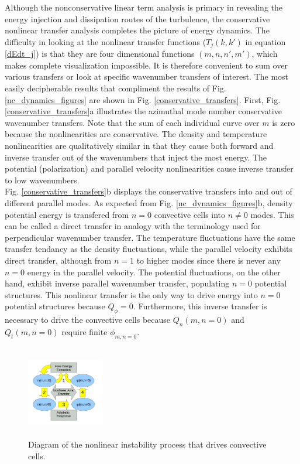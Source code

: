 \documentclass[12pt]{article}
\begin{document}
Although the nonconservative linear term analysis is primary in revealing the energy injection and dissipation routes of the turbulence, the conservative nonlinear transfer analysis completes
the picture of energy dynamics. The difficulty in looking at the nonlinear transfer functions ($T_{j}(k,k')$ in equation \ref{dEdt_j}) is that they are four dimensional functions $(m,n,n',m')$, 
which makes complete visualization impossible. It is therefore convenient to sum over various transfers or look at specific wavenumber transfers of interest. The most easily decipherable
results that compliment the results of Fig. \ref{nc_dynamics_figures} are shown in Fig. \ref{conservative_transfers}. First, Fig. \ref{conservative_transfers}a illustrates the azimuthal mode
number conservative wavenumber transfers. Note that the sum of each individual curve over $m$ is zero because the nonlinearities are conservative. The density and temperature nonlinearities
are qualitatively similar in that they cause both forward and inverse transfer out of the wavenumbers that inject the most energy. The potential (polarization) and parallel velocity 
nonlinearities cause inverse transfer to low wavenumbers. \\

Fig. \ref{conservative_transfers}b displays the conservative transfers into and out
of different parallel modes. As expected from Fig. \ref{nc_dynamics_figures}b, density potential energy is transfered from $n=0$ convective cells into $n \ne 0$ modes. This can be called a direct
transfer in analogy with the terminology used for perpendicular wavenumber transfer. The temperature fluctuations have the same transfer tendancy 
as the density fluctuations, while the parallel velocity exhibits direct transfer, although from $n=1$ to higher modes since there is never any $n=0$ energy in the parallel velocity.
The potential fluctuations, on the other hand, exhibit inverse parallel wavenumber transfer, populating $n=0$ potential structures. This nonlinear transfer is the only way to drive energy into
$n=0$ potential structures because $Q_\phi=0$. Furthermore, this inverse transfer is necessary to drive the convective cells because $Q_n(m,n=0)$ and $Q_t(m,n=0)$ require finite $\phi_{m,n=0}$. \\

\begin{figure}
\includegraphics[width=0.3\textwidth,height=40mm]{nl_instability_diagram}
\hfil
\caption{Diagram of the nonlinear instability process that drives convective cells.}
\label{nl_instability_diagram}
\end{figure}
\end{document}
